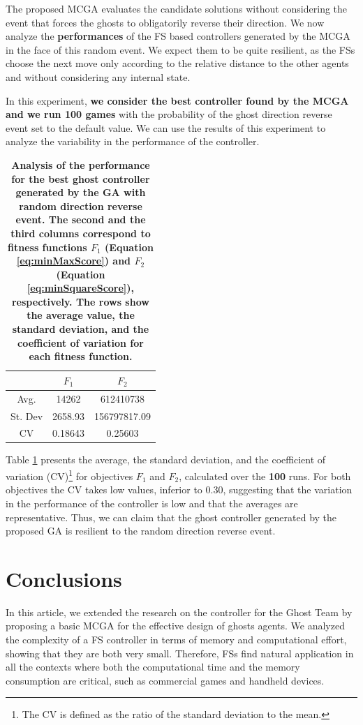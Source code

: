 \documentclass[journal]{IEEEtran}
\begin{document}
The proposed MCGA evaluates the candidate solutions without considering the event that forces the ghosts to obligatorily reverse their direction. We now analyze the \textbf{performances} of the FS based controllers generated by the MCGA in the face of this random event. We expect them to be quite resilient, as the FSs choose the next move only according to the relative distance to the other agents and without considering any internal state.

In this experiment, \textbf{we consider the best controller found by the MCGA and we run 100 games} with the probability of the ghost direction reverse event set to the default value. We can use the results of this experiment to analyze the variability in the performance of the controller.

\begin{table}[!t]
\caption{\textbf{Analysis of the performance for the best ghost controller generated by the GA with random direction reverse event. The second and the third columns correspond to fitness functions $F_1$ (Equation \ref{eq:minMaxScore}) and $F_2$ (Equation \ref{eq:minSquareScore}), respectively. The rows show the average value, the standard deviation, and the coefficient of variation for each fitness function.}}
\label{tab:summary_robust}
\centering
\begin{tabular}{|c|c|c|}
\hline
 & $F_1$ & $F_2$ \\
\hline
Avg.	&	14262	&	612410738	\\
\hline
St. Dev	&	2658.93	&	156797817.09	\\
\hline
CV	&	0.18643	&	0.25603	\\
\hline
\end{tabular}
\end{table}

Table \ref{tab:summary_robust} presents the average, the standard deviation, and the coefficient of variation (CV)\footnote{The CV is defined as the ratio of the standard deviation to the mean.} for objectives $F_1$ and $F_2$, calculated over the \textbf{100} runs. For both objectives the CV takes low values, inferior to 0.30, suggesting that the variation in the performance of the controller is low and that the averages are representative. Thus, we can claim that the ghost controller generated by the proposed GA is resilient to the random direction reverse event.

\section{Conclusions}
\label{sec:Conclusions}
In this article, we extended the research on the controller for the Ghost Team by proposing a basic MCGA for the effective design of ghosts agents. We analyzed the complexity of a FS controller in terms of memory and computational effort, showing that they are both very small. Therefore, FSs find natural application in all the contexts where both the computational time and the memory consumption are critical, such as commercial games and handheld devices.
\end{document}
